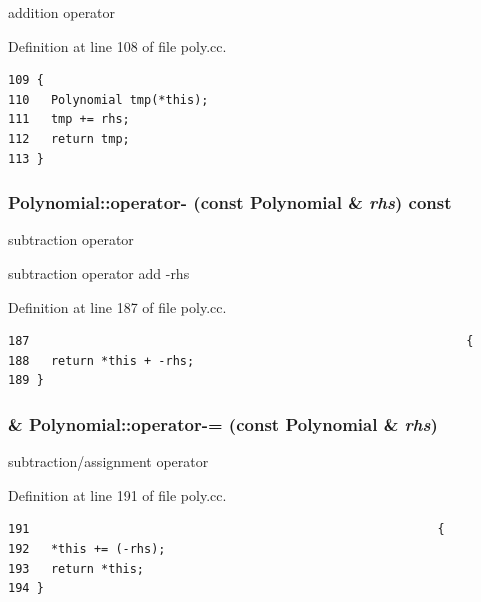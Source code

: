 addition operator 

Definition at line 108 of file poly.cc.

\begin{Code}\begin{verbatim}109 {
110   Polynomial tmp(*this);
111   tmp += rhs;
112   return tmp;
113 }
\end{verbatim}
\end{Code}


\hypertarget{classPolynomial_cff0b8a8c385f43f9d57c80ee925d858}{
\subsubsection[operator-]{ Polynomial::operator- (const {\bf Polynomial} \& {\em rhs}) const}}
\label{classPolynomial_cff0b8a8c385f43f9d57c80ee925d858}


subtraction operator

subtraction operator add -rhs 

Definition at line 187 of file poly.cc.

\begin{Code}\begin{verbatim}187                                                             {
188   return *this + -rhs;
189 }
\end{verbatim}
\end{Code}


\hypertarget{classPolynomial_f89937a0177661ce28acabddc5a9cfaf}{
\subsubsection[operator-=]{ \& Polynomial::operator-= (const {\bf Polynomial} \& {\em rhs})}}
\label{classPolynomial_f89937a0177661ce28acabddc5a9cfaf}


subtraction/assignment operator 

Definition at line 191 of file poly.cc.

\begin{Code}\begin{verbatim}191                                                         {
192   *this += (-rhs);
193   return *this;
194 }
\end{verbatim}
\end{Code}


